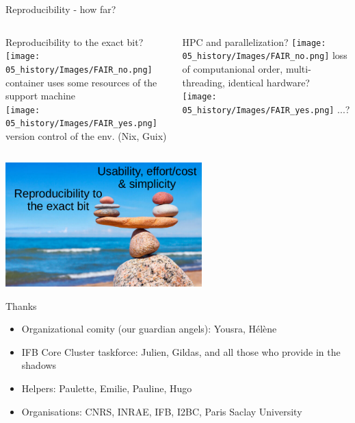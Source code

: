 
\begin{frame}{Reproducibility - how far?}
\begin{columns}
\begin{block}{Reproducibility to the exact bit?}
\texttt{[image: 05\_history/Images/FAIR\_no.png]} container uses some resources of the support machine\\
\texttt{[image: 05\_history/Images/FAIR\_yes.png]} version control of the env. (Nix, Guix)
\end{block}

\begin{block}{HPC and parallelization?}
 \texttt{[image: 05\_history/Images/FAIR\_no.png]} loss of computanional order, multi-threading, identical hardware?\\
 \texttt{[image: 05\_history/Images/FAIR\_yes.png]} ...?
\end{block}
\end{columns}
\begin{center}
    \includegraphics[height=4.8cm]{shared/FAIR_equilibre.png}
\end{center}
\end{frame}
\begin{frame}{Thanks}
\begin{itemize}
    \item Organizational comity (our guardian angels): Yousra, Hélène
    \item IFB Core Cluster taskforce: Julien, Gildas, and all those who provide in the shadows
    \item Helpers: Paulette, Emilie, Pauline, Hugo
    \item Organisations: CNRS, INRAE, IFB, I2BC, Paris Saclay University
\end{itemize}
\end{frame}
